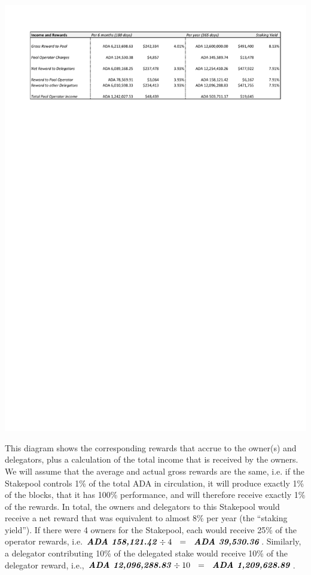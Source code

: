 \documentclass[11pt,a4paper,dvipsnames,twosided,final]{article}
\newcommand{\ada}{ADA{}}
\newcommand{\ADA}[1]{\textbf{\emph{\ada~{#1}}}}
\begin{document}
\begin{minipage}{\textwidth}
  \includegraphics[width=1.2\textwidth]{RC4.pdf}
\end{minipage}

\noindent
This diagram shows the corresponding rewards that accrue to the owner(s) and delegators,
plus a calculation of the total income that is received by the owners.  We will assume that the average
and actual gross rewards are the same, i.e. if the Stakepool controls 1\% of the total \ada{} in
circulation, it will produce exactly 1\% of the blocks, that it has 100\% performance, and will therefore receive exactly 1\% of the rewards.
In total, the
owners and delegators to this Stakepool would receive a net reward that was equivalent to almost 8\% per year
(the ``staking yield'').  If there were 4 owners for the Stakepool, each would receive
25\% of the operator rewards, i.e. $\ADA{158,121.42} \div 4 ~~=~~ \ADA{39,530.36}$.
Similarly, a delegator contributing 10\% of the delegated stake would receive 10\% of
the delegator reward, i.e., $\ADA{12,096,288.83} \div 10 ~~=~~ \ADA{1,209,628.89}$.
\end{document}
